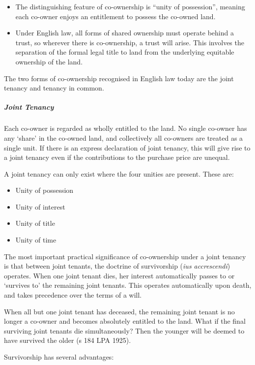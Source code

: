 \documentclass[
]{article}
\providecommand{\tightlist}{%
  \setlength{\itemsep}{0pt}\setlength{\parskip}{0pt}}
\begin{document}
\begin{itemize}
\tightlist
\item
  The distinguishing feature of co-ownership is ``unity of possession'',
  meaning each co-owner enjoys an entitlement to possess the co-owned
  land.
\item
  Under English law, all forms of shared ownership must operate behind a
  trust, so wherever there is co-ownership, a trust will arise. This
  involves the separation of the formal legal title to land from the
  underlying equitable ownership of the land.
\end{itemize}

The two forms of co-ownership recognised in English law today are the
joint tenancy and tenancy in common.

\hypertarget{joint-tenancy-1}{%
\subparagraph{Joint Tenancy}\label{joint-tenancy-1}}

Each co-owner is regarded as wholly entitled to the land. No single
co-owner has any `share' in the co-owned land, and collectively all
co-owners are treated as a single unit. If there is an express
declaration of joint tenancy, this will give rise to a joint tenancy
even if the contributions to the purchase price are unequal.

A joint tenancy can only exist where the four unities are present. These
are:

\begin{itemize}
\tightlist
\item
  Unity of possession
\item
  Unity of interest
\item
  Unity of title
\item
  Unity of time
\end{itemize}

The most important practical significance of co-ownership under a joint
tenancy is that between joint tenants, the doctrine of survivorship
(\emph{ius accrescendi}) operates. When one joint tenant dies, her
interest automatically passes to or `survives to' the remaining joint
tenants. This operates automatically upon death, and takes precedence
over the terms of a will.

When all but one joint tenant has deceased, the remaining joint tenant
is no longer a co-owner and becomes absolutely entitled to the land.
What if the final surviving joint tenants die simultaneously? Then the
younger will be deemed to have survived the older (s 184 LPA 1925).

Survivorship has several advantages:
\end{document}

